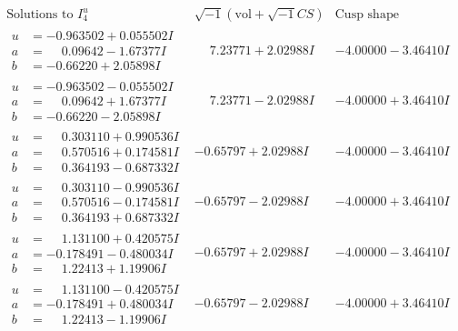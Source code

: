 \documentclass[1p]{elsarticle_modified}
\theoremstyle{definition}
\newcommand{\I}{\sqrt{-1}}
\begin{document}
$$\begin{array}{c|c|c}  
\text{Solutions to }I^u_{4}& \I (\text{vol} + \sqrt{-1}CS) & \text{Cusp shape}\\
 \hline 
\begin{aligned}
u &= -0.963502 + 0.055502 I \\
a &= \phantom{-}0.09642 - 1.67377 I \\
b &= -0.66220 + 2.05898 I\end{aligned}
 & \phantom{-}7.23771 + 2.02988 I & -4.00000 - 3.46410 I \\ \hline\begin{aligned}
u &= -0.963502 - 0.055502 I \\
a &= \phantom{-}0.09642 + 1.67377 I \\
b &= -0.66220 - 2.05898 I\end{aligned}
 & \phantom{-}7.23771 - 2.02988 I & -4.00000 + 3.46410 I \\ \hline\begin{aligned}
u &= \phantom{-}0.303110 + 0.990536 I \\
a &= \phantom{-}0.570516 + 0.174581 I \\
b &= \phantom{-}0.364193 - 0.687332 I\end{aligned}
 & -0.65797 + 2.02988 I & -4.00000 - 3.46410 I \\ \hline\begin{aligned}
u &= \phantom{-}0.303110 - 0.990536 I \\
a &= \phantom{-}0.570516 - 0.174581 I \\
b &= \phantom{-}0.364193 + 0.687332 I\end{aligned}
 & -0.65797 - 2.02988 I & -4.00000 + 3.46410 I \\ \hline\begin{aligned}
u &= \phantom{-}1.131100 + 0.420575 I \\
a &= -0.178491 - 0.480034 I \\
b &= \phantom{-}1.22413 + 1.19906 I\end{aligned}
 & -0.65797 + 2.02988 I & -4.00000 - 3.46410 I \\ \hline\begin{aligned}
u &= \phantom{-}1.131100 - 0.420575 I \\
a &= -0.178491 + 0.480034 I \\
b &= \phantom{-}1.22413 - 1.19906 I\end{aligned}
 & -0.65797 - 2.02988 I & -4.00000 + 3.46410 I \\ \hline\begin{aligned}

\end{aligned}
\end{array}$$
\end{document}
